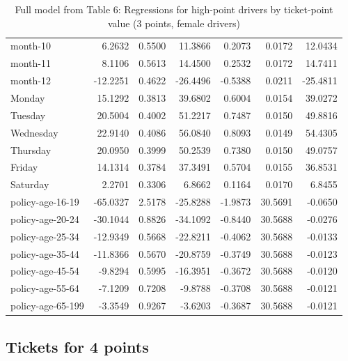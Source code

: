 \documentclass[10pt]{article}
\begin{document}
\begin{table}[ht]
\begin{tabular}{lrrrrrr}
  month-10 & 6.2632 & 0.5500 & 11.3866 & 0.2073 & 0.0172 & 12.0434 \\ 
  month-11 & 8.1106 & 0.5613 & 14.4500 & 0.2532 & 0.0172 & 14.7411 \\ 
  month-12 & -12.2251 & 0.4622 & -26.4496 & -0.5388 & 0.0211 & -25.4811 \\ 
  Monday & 15.1292 & 0.3813 & 39.6802 & 0.6004 & 0.0154 & 39.0272 \\ 
  Tuesday & 20.5004 & 0.4002 & 51.2217 & 0.7487 & 0.0150 & 49.8816 \\ 
  Wednesday & 22.9140 & 0.4086 & 56.0840 & 0.8093 & 0.0149 & 54.4305 \\ 
  Thursday & 20.0950 & 0.3999 & 50.2539 & 0.7380 & 0.0150 & 49.0757 \\ 
  Friday & 14.1314 & 0.3784 & 37.3491 & 0.5704 & 0.0155 & 36.8531 \\ 
  Saturday & 2.2701 & 0.3306 & 6.8662 & 0.1164 & 0.0170 & 6.8455 \\ 
  policy-age-16-19 & -65.0327 & 2.5178 & -25.8288 & -1.9873 & 30.5691 & -0.0650 \\ 
  policy-age-20-24 & -30.1044 & 0.8826 & -34.1092 & -0.8440 & 30.5688 & -0.0276 \\ 
  policy-age-25-34 & -12.9349 & 0.5668 & -22.8211 & -0.4062 & 30.5688 & -0.0133 \\ 
  policy-age-35-44 & -11.8366 & 0.5670 & -20.8759 & -0.3749 & 30.5688 & -0.0123 \\ 
  policy-age-45-54 & -9.8294 & 0.5995 & -16.3951 & -0.3672 & 30.5688 & -0.0120 \\ 
  policy-age-55-64 & -7.1209 & 0.7208 & -9.8788 & -0.3708 & 30.5688 & -0.0121 \\ 
  policy-age-65-199 & -3.3549 & 0.9267 & -3.6203 & -0.3687 & 30.5688 & -0.0121 \\ 
   \hline
\end{tabular}
\caption{Full model from Table 6: Regressions for high-point drivers by ticket-point value (3 points, female drivers)} 
\label{tab_6_3_pts_F}
\end{table}


\clearpage
\pagebreak




\subsection{Tickets for 4 points}
\end{document}
